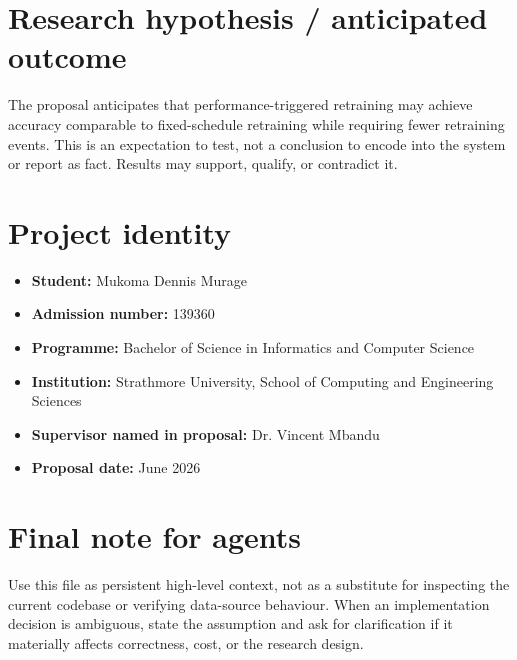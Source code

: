 \documentclass[11pt,a4paper]{article}
\begin{document}
\section{Research hypothesis / anticipated outcome}
The proposal anticipates that performance-triggered retraining may achieve accuracy comparable to fixed-schedule retraining while requiring fewer retraining events. This is an expectation to test, not a conclusion to encode into the system or report as fact. Results may support, qualify, or contradict it.

\section{Project identity}
\begin{itemize}
  \item \textbf{Student:} Mukoma Dennis Murage
  \item \textbf{Admission number:} 139360
  \item \textbf{Programme:} Bachelor of Science in Informatics and Computer Science
  \item \textbf{Institution:} Strathmore University, School of Computing and Engineering Sciences
  \item \textbf{Supervisor named in proposal:} Dr. Vincent Mbandu
  \item \textbf{Proposal date:} June 2026
\end{itemize}

\section*{Final note for agents}
Use this file as persistent high-level context, not as a substitute for inspecting the current codebase or verifying data-source behaviour. When an implementation decision is ambiguous, state the assumption and ask for clarification if it materially affects correctness, cost, or the research design.
\end{document}
